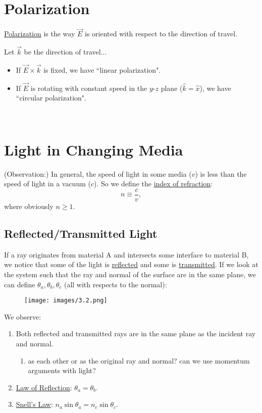 \documentclass{article}
\begin{document}

\section{Polarization}

\underline{Polarization} is the way $\vec{E}$ is oriented with respect to the direction of travel.

Let $\vec{k}$ be the direction of travel...
\begin{itemize}
\item If $\vec{E} \times \vec{k}$ is fixed, we have ``linear polarization".
\item If $\vec{E}$ is rotating with constant speed in the $y$-$z$ plane ($\hat{k} =\hat{x}$), we have ``circular polarization". 
\end{itemize}

\
\hline
\section{Light in Changing Media}

(Observation:) In general, the speed of light in some media ($v$) is less than the speed of light in a vacuum ($c$). So we define the \underline{index of refraction}:
\begin{equation}
n\equiv \frac{c}{v} ,
\end{equation}
where obviously $n\geq 1$.

 
\subsection{Reflected/Transmitted Light}

If a ray originates from material A and intersects some interface to material B, we notice that some of the light is \underline{reflected} and some is \underline{transmitted}. If we look at the system such that the ray and normal of the surface are in the same plane, we can define $\theta _{a} ,\theta _{b} ,\theta _{c}$ (all with respects to the normal):

\begin{figure}[htp]
    \centering
    \texttt{[image: images/3.2.png]}
\end{figure}

We observe:
\begin{enumerate}
\item Both reflected and transmitted rays are in the same plane as the incident ray and normal. 
\begin{enumerate}
\item as each other or as the original ray and normal? can we use momentum arguments with light?
\end{enumerate}
\item \underline{Law of Reflection}: $\boxed{\theta _{a} =\theta _{b}}$.
\item \underline{Snell's Law}: $\boxed{n_{a}\sin \theta _{a} =n_{c}\sin \theta _{c}}$.
\end{enumerate}
\end{document}
